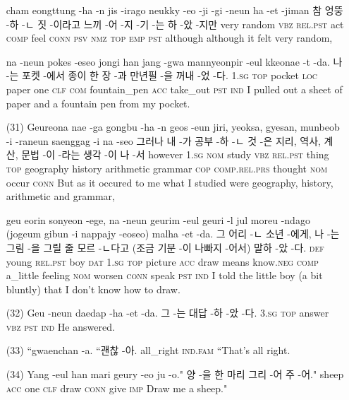 \begin{itemize}
\tgl
		{cham eongttung -ha -n jis -irago neukky -eo -ji -gi -neun ha -et -jiman}
		{참 엉뚱 -하 -ㄴ 짓 -이라고 느끼 -어 -지 -기 -는 하 -았 -지만}
		{very	random	\textsc{vbz}	\textsc{rel.pst}	act	\textsc{comp}	feel	\textsc{conn}	\textsc{psv}	\textsc{nmz}	\textsc{top}	\textsc{emp}	\textsc{pst}	although}
		{although it felt very random,}

\tgl
{na -neun pokes -eseo jongi han jang -gwa mannyeonpir -eul kkeonae -t -da.}
		{나 -는 포켓 -에서 종이 한 장 -과 만년필 -을 꺼내 -었 -다.}
		{\textsc{1.sg}	\textsc{top}	pocket	\textsc{loc}	paper	one	\textsc{clf}	\textsc{com}	fountain\_pen	\textsc{acc}	take\_out	\textsc{pst}	\textsc{ind}}
		{I pulled out a sheet of paper and a fountain pen from my pocket.}
		
\item [(31)]
\tgl
		{Geureona nae -ga gongbu -ha -n geos -eun jiri, yeoksa, gyesan, munbeob -i -raneun saenggag -i na -seo}
		{그러나 내 -가 공부 -하 -ㄴ 것 -은 지리, 역사, 계산, 문법 -이 -라는 생각 -이 나 -서}
		{however	\textsc{1.sg}	\textsc{nom}	study	\textsc{vbz}	\textsc{rel.pst}	thing	\textsc{top}	geography	history	arithmetic	grammar	\textsc{cop}	\textsc{comp.rel.prs}	thought	\textsc{nom}	occur	\textsc{conn}}
		{But as it occured to me what I studied were geography, history, arithmetic and grammar,}

\tgl
		{geu eorin sonyeon -ege, na -neun geurim -eul geuri -l jul moreu -ndago (jogeum gibun -i nappajy -eoseo) malha -et -da.}
		{그 어리 -ㄴ 소년 -에게, 나 -는 그림 -을 그릴 줄 모르 -ㄴ다고 (조금 기분 -이 나빠지 -어서) 말하 -았 -다.}
		{\textsc{def}	young	\textsc{rel.pst}	boy	\textsc{dat}	\textsc{1.sg}	\textsc{top}	picture	\textsc{acc}	draw	means	know.\textsc{neg}	\textsc{comp}	a\_little	feeling	\textsc{nom}	worsen	\textsc{conn}	speak	\textsc{pst}	\textsc{ind}}
		{I told the little boy (a bit bluntly) that I don't know how to draw.}
		
\item [(32)]
\tgl
		{Geu -neun daedap -ha -et -da.}
		{그 -는 대답 -하 -았 -다.}
		{\textsc{3.sg}	\textsc{top}	answer	\textsc{vbz}	\textsc{pst}	\textsc{ind}}
		{He answered.}

\item [(33)]
\tgl
		{``gwaenchan -a.}
		{``괜찮 -아.}
		{all\_right	\textsc{ind.fam}}
		{``That's all right.}

\item [(34)]
\tgl
		{Yang -eul han mari geury -eo ju -o."}
		{양 -을 한 마리 그리 -어 주 -어."}
		{sheep	\textsc{acc}	one	\textsc{clf}	draw	\textsc{conn}	give	\textsc{imp}}
		{Draw me a sheep."}
		

\end{itemize}
